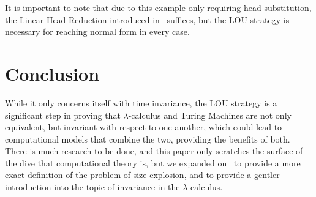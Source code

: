 \documentclass[12pt]{article}
\begin{document}
It is important to note that due to this example only requiring head substitution, the Linear Head Reduction introduced in~\cite{invariance-of-cost-model} suffices, but the LOU strategy is necessary for reaching normal form in every case.

\section{Conclusion}
While it only concerns itself with time invariance, the LOU strategy is a significant step in proving that $\lambda$-calculus and Turing Machines are not only equivalent, but invariant with respect to one another, which could lead to computational models that combine the two, providing the benefits of both. There is much research to be done, and this paper only scratches the surface of the dive that computational theory is, but we expanded on~\cite{beta-invariance} to provide a more exact definition of the problem of size explosion, and to provide a gentler introduction into the topic of invariance in the $\lambda$-calculus.
\printbibliography{}
\end{document}
